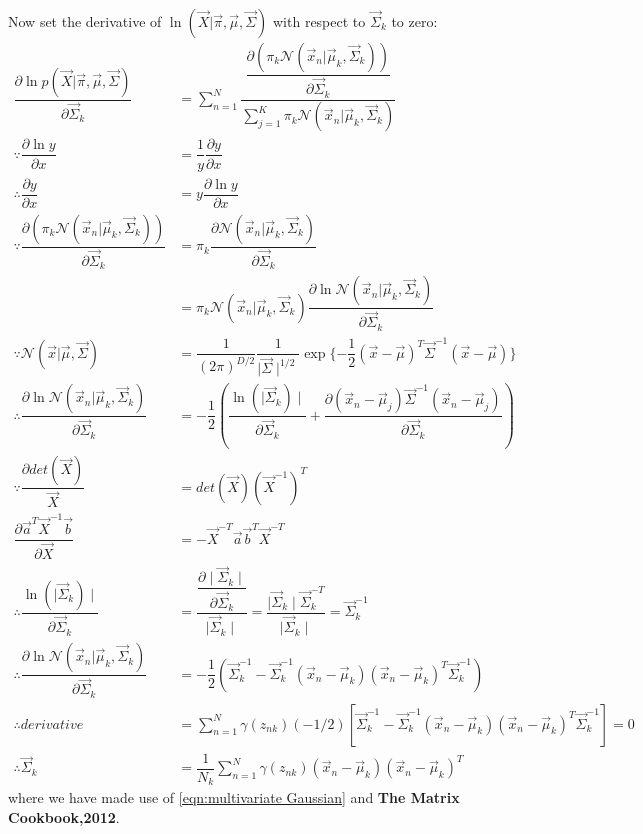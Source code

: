 Now set the derivative of $\ln(\vec{X}|\vec{\pi},\vec{\mu},\vec{\Sigma})$ with respect to $\vec{\Sigma}_k$ to zero:
\begin{align}
\dfrac{\partial\ln p(\vec{X}|\vec{\pi},\vec{\mu},\vec{\Sigma})}{\partial\vec{\Sigma}_k} 
&=\sum_{n=1}^{N}\dfrac{\dfrac{\partial(\pi_k\mathcal{N}(\vec{x}_n|\vec{\mu}_k,\vec{\Sigma}_k))}{\partial\vec{\Sigma}_k}}
{\sum_{j=1}^{K}\pi_k\mathcal{N}(\vec{x}_n|\vec{\mu}_k,\vec{\Sigma}_k)}\\
\because
 \dfrac{\partial \ln y}{\partial x} &= \dfrac{1}{y}\dfrac{\partial y}{\partial x} \\
\therefore \dfrac{\partial y}{\partial x} &= y\dfrac{\partial\ln y}{\partial x}\\
\because \dfrac{\partial(\pi_k\mathcal{N}(\vec{x}_n|\vec{\mu}_k,\vec{\Sigma}_k))}{\partial\vec{\Sigma}_k} 
&= \pi_k\dfrac{\partial\mathcal{N}(\vec{x}_n|\vec{\mu}_k,\vec{\Sigma}_k)}{\partial\vec{\Sigma}_k}\\
&= \pi_k\mathcal{N}(\vec{x}_n|\vec{\mu}_k,\vec{\Sigma}_k)
\dfrac{\partial\ln\mathcal{N}(\vec{x}_n|\vec{\mu}_k,\vec{\Sigma}_k)}{\partial\vec{\Sigma}_k}\\
\because 
\mathcal{N}(\vec{x}|\vec{\mu},\vec{\Sigma})
&=\dfrac{1}{(2\pi)^{D/2}}\dfrac{1}{\mid \vec{\Sigma}\mid^{1/2}}
\exp\{-\dfrac{1}{2}(\vec{x}-\vec{\mu})^T\vec{\Sigma}^{-1}(\vec{x}-\vec{\mu}) \} \\
\therefore \dfrac{\partial\ln\mathcal{N}(\vec{x}_n|\vec{\mu}_k,\vec{\Sigma}_k)}{\partial\vec{\Sigma}_k}
&=-\dfrac{1}{2}(\dfrac{\ln(\mid\vec{\Sigma}_k)\mid}{\partial\vec{\Sigma}_k}
 +\dfrac{\partial(\vec{x}_n-\vec{\mu}_j)\vec{\Sigma}^{-1}(\vec{x}_n-\vec{\mu}_j)}{\partial\vec{\Sigma}_k}) \\
\because
 \dfrac{\partial det(\vec{X})}{\vec{X}} &=det(\vec{X})(\vec{X}^{-1})^T \\
\dfrac{\partial\vec{a}^T\vec{X}^{-1}\vec{b}}{\partial\vec{X}}
&= -\vec{X}^{-T}\vec{a}\vec{b}^T\vec{X}^{-T} \\
\therefore 
\dfrac{\ln(\mid\vec{\Sigma}_k)\mid}{\partial\vec{\Sigma}_k}
&=\dfrac{\dfrac{\partial\mid\vec{\Sigma}_k\mid}{\partial\vec{\Sigma}_k}}{\mid\vec{\Sigma}_k\mid} =\dfrac{\mid\vec{\Sigma}_k\mid\vec{\Sigma}_k^{-T}}{\mid\vec{\Sigma}_k\mid} =\vec{\Sigma}_k^{-1}\\
\therefore 
\dfrac{\partial\ln\mathcal{N}(\vec{x}_n|\vec{\mu}_k,\vec{\Sigma}_k)}{\partial\vec{\Sigma}_k} 
&=-\dfrac{1}{2}(\vec{\Sigma}_k^{-1}-\vec{\Sigma}_k^{-1}(\vec{x}_n-\vec{\mu}_k)(\vec{x}_n-\vec{\mu}_k)^T\vec{\Sigma}_k^{-1}) \\
\therefore derivative&=\sum_{n=1}^{N}\gamma(z_{nk})(-1/2)[\vec{\Sigma}_k^{-1}-\vec{\Sigma}_k^{-1}(\vec{x}_n-\vec{\mu}_k)(\vec{x}_n-\vec{\mu}_k)^T\vec{\Sigma}_k^{-1}] =0 \\
\therefore \vec{\Sigma}_k&=\dfrac{1}{N_k}\sum_{n=1}^{N}\gamma(z_{nk})(\vec{x}_n-\vec{\mu}_k)(\vec{x}_n-\vec{\mu}_k)^T
\end{align}
where we have made use of \ref{eqn:multivariate Gaussian} and \textbf{The Matrix Cookbook,2012}.

